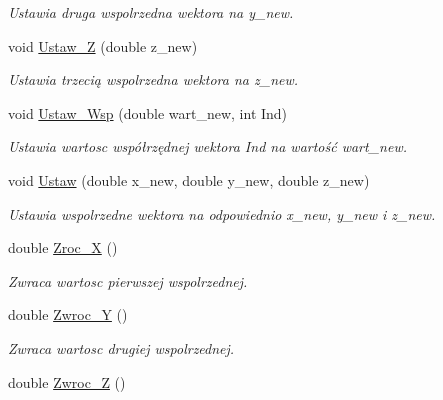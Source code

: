 \begin{DoxyCompactItemize}
\begin{DoxyCompactList}\small\item\em Ustawia druga wspolrzedna wektora na y\+\_\+new. \end{DoxyCompactList}\item 
\hypertarget{class_wektor3_d_a64cbc27a099ff37a65dbbebb92538092}{void \hyperlink{class_wektor3_d_a64cbc27a099ff37a65dbbebb92538092}{Ustaw\+\_\+\+Z} (double z\+\_\+new)}\label{class_wektor3_d_a64cbc27a099ff37a65dbbebb92538092}

\begin{DoxyCompactList}\small\item\em Ustawia trzecią wspolrzedna wektora na z\+\_\+new. \end{DoxyCompactList}\item 
void \hyperlink{class_wektor3_d_a7a99a85bbfe4c9f66fa9cd2247b430fb}{Ustaw\+\_\+\+Wsp} (double wart\+\_\+new, int Ind)
\begin{DoxyCompactList}\small\item\em Ustawia wartosc współrzędnej wektora Ind na wartość wart\+\_\+new. \end{DoxyCompactList}\item 
\hypertarget{class_wektor3_d_a1ac068fea5074de06f0f293a137882ec}{void \hyperlink{class_wektor3_d_a1ac068fea5074de06f0f293a137882ec}{Ustaw} (double x\+\_\+new, double y\+\_\+new, double z\+\_\+new)}\label{class_wektor3_d_a1ac068fea5074de06f0f293a137882ec}

\begin{DoxyCompactList}\small\item\em Ustawia wspolrzedne wektora na odpowiednio x\+\_\+new, y\+\_\+new i z\+\_\+new. \end{DoxyCompactList}\item 
\hypertarget{class_wektor3_d_a8ae0ee10060975ddfab0868cca9e9caf}{double \hyperlink{class_wektor3_d_a8ae0ee10060975ddfab0868cca9e9caf}{Zroc\+\_\+\+X} ()}\label{class_wektor3_d_a8ae0ee10060975ddfab0868cca9e9caf}

\begin{DoxyCompactList}\small\item\em Zwraca wartosc pierwszej wspolrzednej. \end{DoxyCompactList}\item 
\hypertarget{class_wektor3_d_afef4797c5d3588a45ecb966f255d778b}{double \hyperlink{class_wektor3_d_afef4797c5d3588a45ecb966f255d778b}{Zwroc\+\_\+\+Y} ()}\label{class_wektor3_d_afef4797c5d3588a45ecb966f255d778b}

\begin{DoxyCompactList}\small\item\em Zwraca wartosc drugiej wspolrzednej. \end{DoxyCompactList}\item 
\hypertarget{class_wektor3_d_ada80815adc843eae426926b95874b9b0}{double \hyperlink{class_wektor3_d_ada80815adc843eae426926b95874b9b0}{Zwroc\+\_\+\+Z} ()}\label{class_wektor3_d_ada80815adc843eae426926b95874b9b0}


\end{DoxyCompactItemize}
